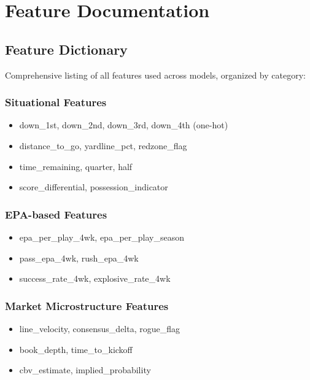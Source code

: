 \chapter{Feature Documentation}

\section{Feature Dictionary}
Comprehensive listing of all features used across models, organized by category:

\subsection{Situational Features}
\begin{itemize}
  \item down\_1st, down\_2nd, down\_3rd, down\_4th (one-hot)
  \item distance\_to\_go, yardline\_pct, redzone\_flag
  \item time\_remaining, quarter, half
  \item score\_differential, possession\_indicator
\end{itemize}

\subsection{EPA-based Features}
\begin{itemize}
  \item epa\_per\_play\_4wk, epa\_per\_play\_season
  \item pass\_epa\_4wk, rush\_epa\_4wk
  \item success\_rate\_4wk, explosive\_rate\_4wk
\end{itemize}

\subsection{Market Microstructure Features}
\begin{itemize}
  \item line\_velocity, consensus\_delta, rogue\_flag
  \item book\_depth, time\_to\_kickoff
  \item cbv\_estimate, implied\_probability
\end{itemize}


